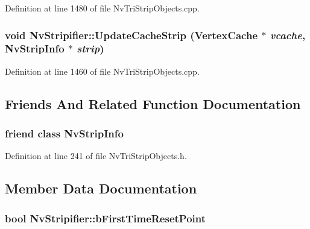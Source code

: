 Definition at line 1480 of file NvTriStripObjects.cpp.\hypertarget{class_nv_stripifier_7f4b921943317075f76558c4665c7d58}{
\subsubsection[{UpdateCacheStrip}]{\setlength{\rightskip}{0pt plus 5cm}void NvStripifier::UpdateCacheStrip ({\bf VertexCache} $\ast$ {\em vcache}, \/  {\bf NvStripInfo} $\ast$ {\em strip})}}
\label{class_nv_stripifier_7f4b921943317075f76558c4665c7d58}




Definition at line 1460 of file NvTriStripObjects.cpp.

\subsection{Friends And Related Function Documentation}
\hypertarget{class_nv_stripifier_d22e3e239c25e2052beb1021c7e54c96}{
\subsubsection[{NvStripInfo}]{\setlength{\rightskip}{0pt plus 5cm}friend class {\bf NvStripInfo}}}
\label{class_nv_stripifier_d22e3e239c25e2052beb1021c7e54c96}




Definition at line 241 of file NvTriStripObjects.h.

\subsection{Member Data Documentation}
\hypertarget{class_nv_stripifier_3f2fe6f8f5de4f3e25077d7e486627af}{
\subsubsection[{bFirstTimeResetPoint}]{\setlength{\rightskip}{0pt plus 5cm}bool {\bf NvStripifier::bFirstTimeResetPoint}}}
\label{class_nv_stripifier_3f2fe6f8f5de4f3e25077d7e486627af}




